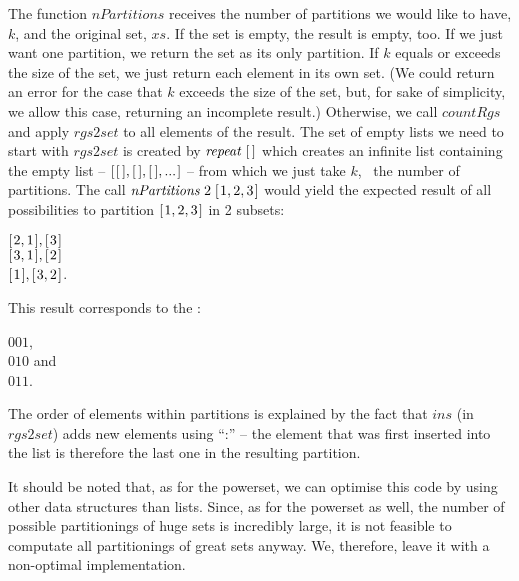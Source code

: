 \documentclass{scrreprt}
\newcommand{\Varid}[1]{\mathit{#1}}
\begin{document}
The function \ensuremath{\Varid{nPartitions}} receives 
the number of partitions we would like to have, $k$,
and the original set, \ensuremath{\Varid{xs}}.
If the set is empty, the result is empty, too.
If we just want one partition, we return the set as its only partition.
If $k$ equals or exceeds the size of the set,
we just return each element in its own set.
(We could return an error for the case that $k$ exceeds the size
of the set, but, for sake of simplicity, we allow this case, 
returning an incomplete result.)
Otherwise, we call \ensuremath{\Varid{countRgs}}
and apply \ensuremath{\Varid{rgs2set}} to all elements of the result.
The set of empty lists we need to start with \ensuremath{\Varid{rgs2set}}
is created by \ensuremath{\Varid{repeat}\;[\mskip1.5mu \mskip1.5mu]} which creates an infinite list
containing the empty list -- \ensuremath{[\mskip1.5mu [\mskip1.5mu \mskip1.5mu],[\mskip1.5mu \mskip1.5mu],[\mskip1.5mu \mskip1.5mu],\mathbin{...}\mskip1.5mu]} --
from which we just take $k$, \ie\ the number of partitions.
The call \ensuremath{\Varid{nPartitions}\;\mathrm{2}\;[\mskip1.5mu \mathrm{1},\mathrm{2},\mathrm{3}\mskip1.5mu]} would
yield the expected result of all possibilities
to partition \ensuremath{[\mskip1.5mu \mathrm{1},\mathrm{2},\mathrm{3}\mskip1.5mu]} in 2 subsets:

\ensuremath{[\mskip1.5mu \mathrm{2},\mathrm{1}\mskip1.5mu],[\mskip1.5mu \mathrm{3}\mskip1.5mu]}\\
\ensuremath{[\mskip1.5mu \mathrm{3},\mathrm{1}\mskip1.5mu],[\mskip1.5mu \mathrm{2}\mskip1.5mu]}\\
\ensuremath{[\mskip1.5mu \mathrm{1}\mskip1.5mu],[\mskip1.5mu \mathrm{3},\mathrm{2}\mskip1.5mu]}.

This result corresponds to the :

$001$,\\
$010$ and \\
$011$.

The order of elements within partitions is explained by the fact
that \ensuremath{\Varid{ins}} (in \ensuremath{\Varid{rgs2set}}) adds new elements using ``\ensuremath{\mathbin{:}}'' --
the element that was first inserted into the list
is therefore the last one in the resulting partition.

It should be noted that, as for the powerset,
we can optimise this code by using other data structures than lists.
Since, as for the powerset as well, 
the number of possible partitionings of huge sets
is incredibly large, it is not feasible
to computate all partitionings of great sets anyway.
We, therefore, leave it with a non-optimal implementation.
\end{document}
